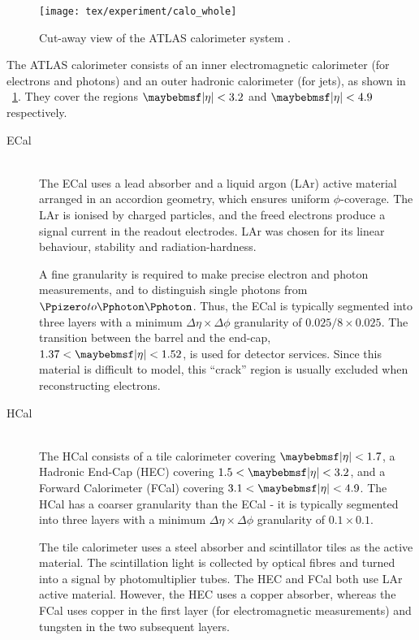 \begin{figure}
	\texttt{[image: tex/experiment/calo\_whole]}
	\caption{Cut-away view of the ATLAS calorimeter system \cite{ATLAS-detector}.}
	\label{fig:calorimeters}
\end{figure}

The ATLAS calorimeter consists of an inner electromagnetic calorimeter (for electrons and 
photons) and an outer hadronic calorimeter (for jets), as shown in 
\Figure~\ref{fig:calorimeters}. They cover the regions $\mods{\eta} < 3.2$ and 
$\mods{\eta} < 4.9$ respectively.
\begin{description}
\item[\ac{ECal}] \hfill \\
	The \ac{ECal} uses a lead absorber and a liquid argon (LAr) active material arranged 
	in an accordion geometry, which ensures uniform $\phi$-coverage. The LAr is ionised 
	by charged particles, and the freed electrons produce a signal current in the readout 
	electrodes. LAr was chosen for its linear behaviour, stability and radiation-hardness.

	A fine granularity is required to make precise electron and photon measurements, and 
	to distinguish single photons from $\HepProcess{\Ppizero \HepTo \Pphoton \Pphoton}$. 
	Thus, the \ac{ECal} is typically segmented into three layers with a minimum 
	$\Delta\eta\times\Delta\phi$ granularity of $0.025/8 \times 0.025$. The transition 
	between the barrel and the end-cap, $1.37 < \mods{\eta} < 1.52$, is used for detector 
	services. Since this material is difficult to model, this ``crack'' region is usually 
	excluded when reconstructing electrons.
\item[\ac{HCal}] \hfill \\
	The \ac{HCal} consists of a tile calorimeter covering $\mods{\eta} < 1.7$, a Hadronic 
	End-Cap (HEC) covering $1.5 < \mods{\eta} < 3.2$, and a Forward Calorimeter (FCal) 
	covering $3.1 < \mods{\eta} < 4.9$. The \ac{HCal} has a coarser granularity than the
	\ac{ECal} - it is typically segmented into three layers with a minimum 
	$\Delta\eta\times\Delta\phi$ granularity of $0.1 \times 0.1$.

	The tile calorimeter uses a steel absorber and scintillator tiles as the active 
	material. The scintillation light is collected by optical fibres and turned into a 
	signal by photomultiplier tubes. The HEC and FCal both use LAr active material.
	However, the HEC uses a copper absorber, whereas the FCal uses copper in the first 
	layer (for electromagnetic measurements) and tungsten in the two subsequent layers.
\end{description}

